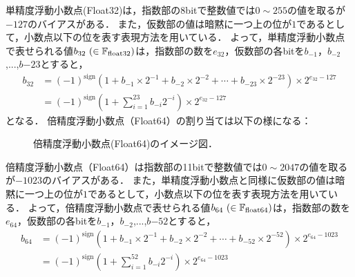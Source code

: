 単精度浮動小数点(Float32)は，指数部の8bitで整数値では$0 \sim  255$の値を取るが$-127$のバイアスがある．
また，仮数部の値は暗黙に一つ上の位が$1$であるとして，小数点以下の位を表す表現方法を用いている．
よって，単精度浮動小数点で表せられる値$b_{32} \ (\in \mathbb{F}_{\text{float}32})$は，指数部の数を$e_{32}$，仮数部の各bitを$b_{-1}$，$b_{-2}$,...,$b{-23}$とすると，
\begin{align}
    b_{32} &= (-1)^{\mathrm{sign}}(1 + b_{-1}\times 2^{-1} + b_{-2}\times 2^{-2} + \cdots + b_{-23}\times 2^{-23})\times 2^{e_{32} - 127} \\
        &= (-1)^{\mathrm{sign}}\left(1 + \sum_{i = 1}^{23} b_{-i} 2^{-i}\right)\times 2^{e_{32} - 127}
\end{align}
となる．
倍精度浮動小数点（Float64）の割り当ては以下の様になる：
\begin{figure}[H]
    \centering
    \caption{倍精度浮動小数点(Float64)のイメージ図．}
    \label{fig:float64_bit}
\end{figure}
倍精度浮動小数点（Float64）は指数部の11bitで整数値では$0 \sim  2047$の値を取るが$-1023$のバイアスがある．
また，単精度浮動小数点と同様に仮数部の値は暗黙に一つ上の位が$1$であるとして，小数点以下の位を表す表現方法を用いている．
よって，倍精度浮動小数点で表せられる値$b_{64} \ (\in \mathbb{F}_{\text{float}64})$は，指数部の数を$e_{64}$，仮数部の各bitを$b_{-1}$，$b_{-2}$,...,$b{-52}$とすると，
\begin{align}
    b_{64} &= (-1)^{\mathrm{sign}}(1 + b_{-1}\times 2^{-1} + b_{-2}\times 2^{-2} + \cdots + b_{-52}\times 2^{-52})\times 2^{e_{64} - 1023} \\
        &= (-1)^{\mathrm{sign}}\left(1 + \sum_{i = 1}^{52} b_{-i} 2^{-i}\right)\times 2^{e_{64} - 1023}
\end{align}
